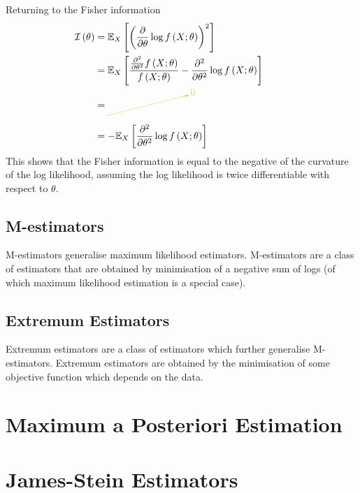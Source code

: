 \documentclass[11pt]{report} %
\begin{document}
Returning to the Fisher information
\begin{align}
\mathcal{I}\left(\theta\right) &= \mathbb{E}_{X}\left[\left(\dfrac{\partial}{\partial \theta}\log f\left(X;\theta\right)\right)^{2}\right] \\
&= \mathbb{E}_{X}\left[\dfrac{\frac{\partial^{2}}{\partial \theta^{2}}f\left(X;\theta\right)}{f\left(X;\theta\right)} - \dfrac{\partial^{2}}{\partial \theta^{2}}\log f\left(X;\theta\right)\right] \\
&= \green\cancelto{0}{\black \mathbb{E}_{X}\left[\dfrac{\frac{\partial^{2}}{\partial \theta^{2}}f\left(X;\theta\right)}{f\left(X;\theta\right)}\right]}\black - \mathbb{E}_{X}\left[\dfrac{\partial^{2}}{\partial \theta^{2}}\log f\left(X;\theta\right)\right] \\
&= - \mathbb{E}_{X}\left[\dfrac{\partial^{2}}{\partial \theta^{2}}\log f\left(X;\theta\right)\right]
\end{align}
This shows that the Fisher information is equal to the negative of the curvature of the log likelihood, assuming the log likelihood is twice differentiable with respect to $\theta$.

\subsection{M-estimators}

M-estimators generalise maximum likelihood estimators. M-estimators are a class of estimators that are obtained by minimisation of a negative sum of logs (of which maximum likelihood estimation is a special case).

\subsection{Extremum Estimators}

Extremum estimators are a class of estimators which further generalise M-estimators. Extremum estimators are obtained by the minimisation of some objective function which depends on the data.

\section{Maximum a Posteriori Estimation}

\section{James-Stein Estimators}
\end{document}
